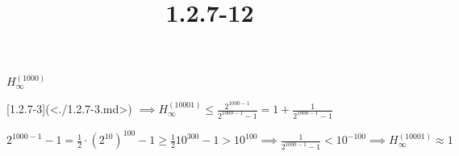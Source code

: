 \documentclass{article}
\title{1.2.7-12}
\begin{document}
\maketitle

\( H_{\infty}^{(1000)} \)

[1.2.7-3](<./1.2.7-3.md>) \( \implies H_{\infty}^{(10001)} \leq \frac{2^{1000-1}}{2^{1000-1}-1} = 1 + \frac{1}{2^{1000-1}-1} \)

\( 2^{1000-1}-1 = \frac{1}{2} \cdot (2^{10})^{100} - 1 \geq \frac{1}{2} 10^{300} - 1 > 10^{100} \implies \frac{1}{2^{1000-1}-1} < 10^{-100} \implies H_{\infty}^{(10001)} \approx 1 \)
\end{document}
